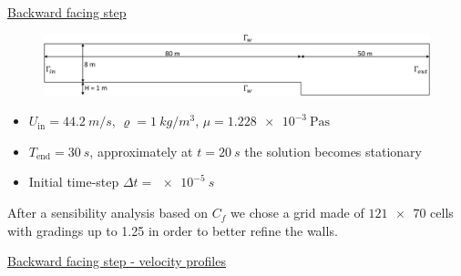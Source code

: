 \documentclass{beamer}
\begin{document}
\begin{frame}[label=bfsSupp]{\hyperlink{bfs}{Backward facing step}}
\begin{figure}
	\centering
	\includegraphics[width=\textwidth]{bfs_domain.pdf}
\end{figure}
\begin{itemize}
	\item $U_\text{in} = \SI{44.2}{m/s}$, $\varrho=\SI{1}{kg/m^3}$, 
	$\mu=\SI{1.228e-3}{\pascal\second}$
	\item $T_\text{end}=\SI{30}{s}$, approximately at $t=\SI{20}{s}$ the 
	solution becomes stationary
	\item Initial time-step $\Delta t=\SI{e-5}{s}$
\end{itemize}
After a sensibility analysis based on $C_f$ we chose a grid made of 
$\num{121x70}$ cells with gradings up to 1.25 in order to better 
refine the walls.
\end{frame}
\begin{frame}{\hyperlink{bfs}{Backward facing step - velocity profiles}}
\vspace{-0.7cm}
\begin{figure}
	\subfloat[\tiny Profile at 
	$x/H=-4$]{\hspace{-1cm}}
	\subfloat[\tiny Profile at 
	$x/H=4$]{\hspace{-0.3cm}}
\end{figure}
\end{frame}
\end{document}
